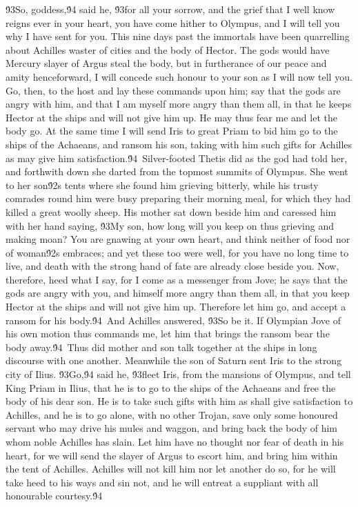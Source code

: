 {\'93So, goddess,\'94 said he, \'93for all your sorrow, and the grief that I well know reigns ever in your heart, you have come hither to Olympus, and I will tell you why I have sent for you. This nine days past the immortals have been quarrelling about Achilles waster of cities and the body of Hector. The gods would have Mercury slayer of Argus steal the body, but in furtherance of our peace and amity henceforward, I will concede such honour to your son as I will now tell you. Go, then, to the host and lay these commands upon him; say that the gods are angry with him, and that I am myself more angry than them all, in that he keeps Hector at the ships and will not give him up. He may thus fear me and let the body go. At the same time I will send Iris to great Priam to bid him go to the ships of the Achaeans, and ransom his son, taking with him such gifts for Achilles as may give him satisfaction.\'94\
Silver-footed Thetis did as the god had told her, and forthwith down she darted from the topmost summits of Olympus. She went to her son\'92s tents where she found him grieving bitterly, while his trusty comrades round him were busy preparing their morning meal, for which they had killed a great woolly sheep. His mother sat down beside him and caressed him with her hand saying, \'93My son, how long will you keep on thus grieving and making moan? You are gnawing at your own heart, and think neither of food nor of woman\'92s embraces; and yet these too were well, for you have no long time to live, and death with the strong hand of fate are already close beside you. Now, therefore, heed what I say, for I come as a messenger from Jove; he says that the gods are angry with you, and himself more angry than them all, in that you keep Hector at the ships and will not give him up. Therefore let him go, and accept a ransom for his body.\'94\
And Achilles answered, \'93So be it. If Olympian Jove of his own motion thus commands me, let him that brings the ransom bear the body away.\'94\
Thus did mother and son talk together at the ships in long discourse with one another. Meanwhile the son of Saturn sent Iris to the strong city of Ilius. \'93Go,\'94 said he, \'93fleet Iris, from the mansions of Olympus, and tell King Priam in Ilius, that he is to go to the ships of the Achaeans and free the body of his dear son. He is to take such gifts with him as shall give satisfaction to Achilles, and he is to go alone, with no other Trojan, save only some honoured servant who may drive his mules and waggon, and bring back the body of him whom noble Achilles has slain. Let him have no thought nor fear of death in his heart, for we will send the slayer of Argus to escort him, and bring him within the tent of Achilles. Achilles will not kill him nor let another do so, for he will take heed to his ways and sin not, and he will entreat a suppliant with all honourable courtesy.\'94\
}
